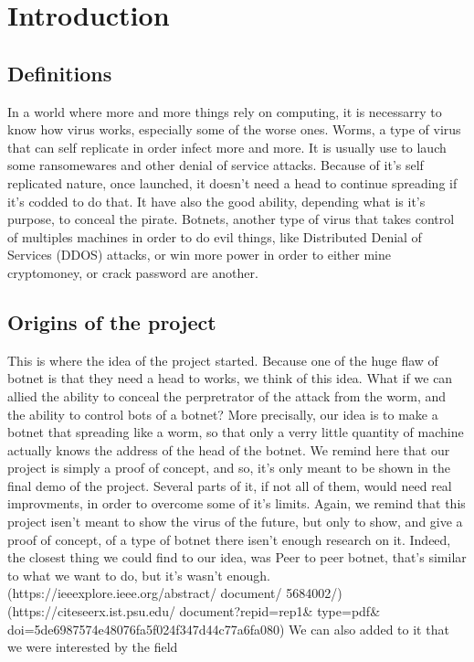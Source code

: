 \documentclass[../main.tex]{subfiles}
\begin{document}
    \newpage

	\chapter{Introduction}

    \section{Definitions}

    In a world where more and more things rely on computing, it is necessarry to know how virus works, especially some of the worse ones. 
    Worms, a type of virus that can self replicate in order infect more and more.
    It is usually use to lauch some ransomewares and other denial of service attacks. 
    Because of it's self replicated nature, once launched, it doesn't need a head to continue spreading if it's codded to do that.
    It have also the good ability, depending what is it's purpose, to conceal the pirate.
    Botnets, another type of virus that takes control of multiples machines in order to do evil things, like Distributed Denial of Services (DDOS) attacks, or win more power in order to either mine cryptomoney, or crack password are another.

	\vspace{10pt}
    
    \section{Origins of the project}

    This is where the idea of the project started.
    Because one of the huge flaw of botnet is that they need a head to works, we think of this idea.
    What if we can allied the ability to conceal the perpretrator of the attack from the worm, and the ability to control bots of a botnet?
    More precisally, our idea is to make a botnet that spreading like a worm, so that only a verry little quantity of machine actually knows the address of the head of the botnet.
    We remind here that our project is simply a proof of concept, and so, it's only meant to be shown in the final demo of the project.
    Several parts of it, if not all of them, would need real improvments, in order to overcome some of it's limits.
    Again, we remind that this project isen't meant to show the virus of the future, but only to show, and give a proof of concept, of a type of botnet there isen't enough research on it.
    Indeed, the closest thing we could find to our idea, was Peer to peer botnet, that's similar to what we want to do, but it's wasn't enough.
    (https://ieeexplore.ieee.org/abstract/
    document/
    5684002/)
    (https://citeseerx.ist.psu.edu/
    document?repid=rep1\&
    type=pdf\&
    doi=5de6987574e48076fa5f024f347d44c77a6fa080)
    We can also added to it that we were interested by the field 
\end{document}
